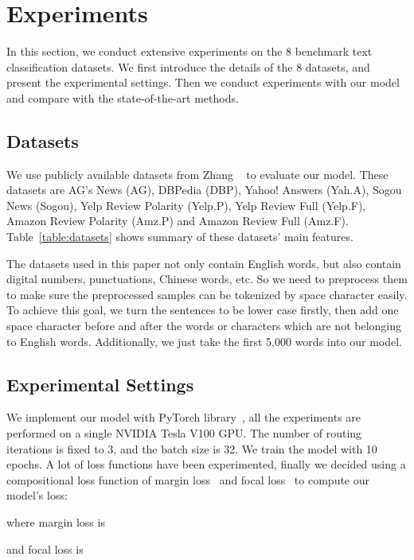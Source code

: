 \documentclass[times,twocolumn,final]{elsarticle}
\begin{document}
\section{Experiments}

In this section, we conduct extensive experiments on the 8 benchmark text classification datasets. We first introduce the details of the 8 datasets, and present the experimental settings. Then we conduct experiments with our model and compare with the state-of-the-art methods.

\subsection{Datasets}

We use publicly available datasets from Zhang \etal~\cite{zhang2015character} to evaluate our model. These datasets are AG's News (AG), DBPedia (DBP), Yahoo! Answers (Yah.A), Sogou News (Sogou), Yelp Review Polarity (Yelp.P), Yelp Review Full (Yelp.F), Amazon Review Polarity (Amz.P) and Amazon Review Full (Amz.F). Table~\ref{table:datasets} shows summary of these datasets' main features.

The datasets used in this paper not only contain English words, but also contain digital numbers, punctuations, Chinese words, etc. So we need to preprocess them to make sure the preprocessed samples can be tokenized by space character easily. To achieve this goal, we turn the sentences to be lower case firstly, then add one space character before and after the words or characters which are not belonging to English words. Additionally, we just take the first 5,000 words into our model.

\subsection{Experimental Settings}

We implement our model with PyTorch library~\cite{paszke2019pytorch}, all the experiments are performed on a single NVIDIA Tesla V100 GPU. The number of routing iterations is fixed to 3, and the batch size is 32. We train the model with 10 epochs. A lot of loss functions have been experimented, finally we decided using a compositional loss function of margin loss~\cite{sabour2017dynamic} and focal loss~\cite{lin2017focal} to compute our model's loss:
    
    where margin loss is
    
    and focal loss is
    
\end{document}
